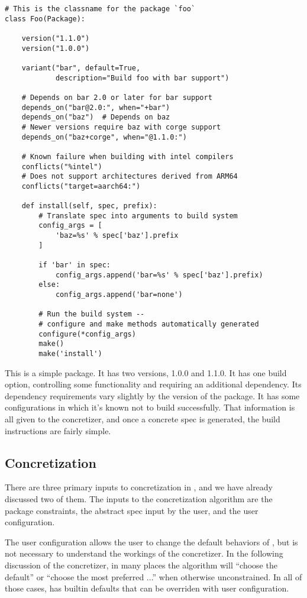 \begin{verbatim}
# This is the classname for the package `foo`
class Foo(Package):

    version("1.1.0")
    version("1.0.0")

    variant("bar", default=True,
            description="Build foo with bar support")

    # Depends on bar 2.0 or later for bar support
    depends_on("bar@2.0:", when="+bar")
    depends_on("baz")  # Depends on baz
    # Newer versions require baz with corge support
    depends_on("baz+corge", when="@1.1.0:")

    # Known failure when building with intel compilers
    conflicts("%intel")
    # Does not support architectures derived from ARM64
    conflicts("target=aarch64:")

    def install(self, spec, prefix):
        # Translate spec into arguments to build system
        config_args = [
            'baz=%s' % spec['baz'].prefix
        ]

        if 'bar' in spec:
            config_args.append('bar=%s' % spec['baz'].prefix)
        else:
            config_args.append('bar=none')

        # Run the build system -- 
        # configure and make methods automatically generated
        configure(*config_args)
        make()
        make('install')
\end{verbatim}

This is a simple package.
It has two versions, 1.0.0 and 1.1.0.
It has one build option, controlling some functionality and requiring an additional dependency.
Its dependency requirements vary slightly by the version of the package.
It has some configurations in which it's known not to build successfully.
That information is all given to the concretizer, and once a concrete spec is generated, the build instructions are fairly simple.

\subsection{Concretization}

There are three primary inputs to concretization in \spack, and we have already discussed two of them.
The inputs to the concretization algorithm are the package constraints, the abstract spec input by the user, and the user configuration.

The user configuration allows the user to change the default behaviors of \spack, but is not necessary to understand the workings of the concretizer.
In the following discussion of the concretizer, in many places the algorithm will ``choose the default'' or ``choose the most preferred ...'' when otherwise unconstrained.
In all of those cases, \spack has builtin defaults that can be overriden with user configuration.

